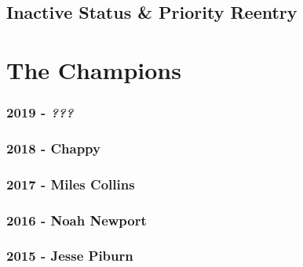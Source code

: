 \documentclass[]{book}
\begin{document}
\hypertarget{inactive-status-priority-reentry}{%
\section{Inactive Status \& Priority Reentry}\label{inactive-status-priority-reentry}}

\hypertarget{appendix-appendix}{%
\appendix}


\hypertarget{the-champions}{%
\chapter{The Champions}\label{the-champions}}

\hypertarget{section}{%
\subsection*{\texorpdfstring{\textbf{2019} - \emph{???}}{2019 - ???}}\label{section}}

\hypertarget{chappy}{%
\subsection*{\texorpdfstring{\textbf{2018} - Chappy}{2018 - Chappy}}\label{chappy}}

\hypertarget{miles-collins-1}{%
\subsection*{\texorpdfstring{\textbf{2017} - Miles Collins}{2017 - Miles Collins}}\label{miles-collins-1}}

\hypertarget{noah-newport}{%
\subsection*{\texorpdfstring{\textbf{2016} - Noah Newport}{2016 - Noah Newport}}\label{noah-newport}}

\hypertarget{jesse-piburn}{%
\subsection*{\texorpdfstring{\textbf{2015} - Jesse Piburn}{2015 - Jesse Piburn}}\label{jesse-piburn}}
\end{document}
